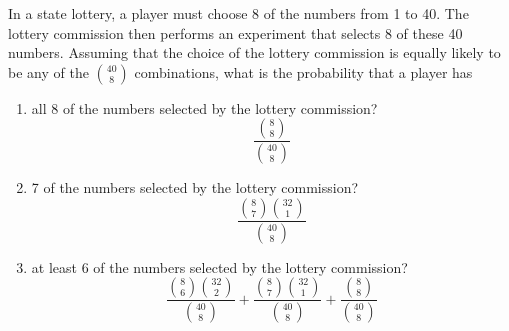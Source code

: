 \item In a state lottery, a player must choose 8 of the numbers from 1 to 40. The lottery commission then performs an experiment that selects 8 of these 40 numbers. Assuming that the choice of the lottery commission is equally likely to be any of the $\binom{40}{8}$ combinations, what is the probability that a player has
\begin{enumerate}
    \item all 8 of the numbers selected by the lottery commission?
    \[ \frac{\binom{8}{8}}{\binom{40}{8}} \]
    \item 7 of the numbers selected by the lottery commission?
    \[ \frac{\binom{8}{7}\binom{32}{1}}{\binom{40}{8}} \]
    \item at least 6 of the numbers selected by the lottery commission?
    \[ \frac{\binom{8}{6}\binom{32}{2}}{\binom{40}{8}} + \frac{\binom{8}{7}\binom{32}{1}}{\binom{40}{8}} + \frac{\binom{8}{8}}{\binom{40}{8}} \]
\end{enumerate}